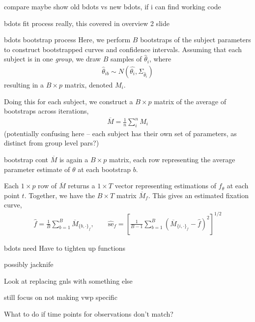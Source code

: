 \documentclass{beamer}
\begin{document}
\begin{frame}{compare}
maybe show old bdots vs new bdots, if i can find working code
\end{frame}

\begin{frame}{bdots fit process}
really, this covered in overview 2 slide
\end{frame}

\begin{frame}{bdots bootstrap process}
Here, we perform $B$ bootstraps of the subject parameters to construct bootstrapped curves and confidence intervals. Assuming that each subject is in one \textit{group}, we draw $B$ samples of $\hat{\theta}_i$, where 
\begin{align*}
\hat{\theta}_{ib} \sim N \left(\hat{\theta_i},  \Sigma_{\hat{\theta}_i} \right)
\end{align*}
resulting in a $B\times p$ matrix, denoted $M_i$. \newline 

Doing this for each subject, we construct a $B\times p$ matrix of the average of bootstraps across iterations, 
\begin{align*}
\overline{M} = \frac1n \sum_{i}^n M_i
\end{align*}
(potentially confusing here -- each subject has their own set of parameters, as distinct from group level pars?)
\end{frame}

\begin{frame}{bootstrap cont}
$\overline{M}$ is again a $B \times p$ matrix, each row  representing the average parameter estimate of $\theta$ at each bootstrap $b$. \newline 

Each $1\times p$ row of $\overline{M}$ returns a $1 \times T$ vector representing estimations of $f_{\theta}$ at each point $t$. Together, we have the $B \times T$ matrix $\overline{M}_f$. This gives an estimated fixation curve, 
\begin{align*}
\hat{f} = \frac1B \sum_{b=1}^B \overline{M}_{\{b, \cdot\}_f}, \qquad \widehat{\text{se}}_{f} = \left[ \frac{1}{B-1} \sum_{b=1}^B \left( \overline{M}_{\{i, \cdot\}_{f}} - \hat{f} \right)^2 \right]^{1/2} 
\end{align*}
\end{frame}

\begin{frame}{bdots need}
Have to tighten up functions \newline 

possibly jacknife \newline 

Look at replacing gnls with something else \newline 

still focus on not making vwp specific \newline

What to do if time points for observations don't match?
\end{frame}
\end{document}
